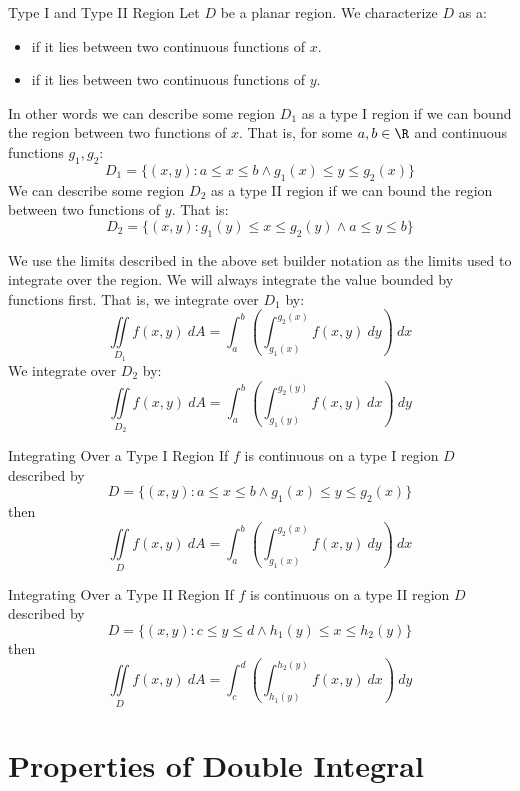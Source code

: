 \begin{dfnbox}{Type I and Type II Region}{}
    Let $D$ be a planar region. We characterize $D$ as a:
    \begin{itemize}
        \item {} if it lies between two continuous functions of $x$.
        \item {} if it lies between two continuous functions of $y$.
    \end{itemize}
\end{dfnbox}

In other words we can describe some region $D_1$ as a type I region if we can bound the region between two functions of $x$. That is, for some $a,b \in \R$ and continuous functions $g_1,g_2$:
\[ D_1 = \{ (x,y) : a \leq x \leq b \land g_1(x) \leq y \leq g_2(x) \} \]
We can describe some region $D_2$ as a type II region if we can bound the region between two functions of $y$. That is:
\[ D_2 = \{ (x,y) : g_1(y) \leq x \leq g_2(y) \land a \leq y \leq b \} \]

We use the limits described in the above set builder notation as the limits used to integrate over the region. We will always integrate the value bounded by functions first. That is, we integrate over $D_1$ by:
\[ \iint\limits_{D_1} f(x,y)\ dA = \int_a^b \left( \int_{g_1(x)}^{g_2(x)} f(x,y)\ dy \right)\ dx \]
We integrate over $D_2$ by:
\[ \iint\limits_{D_2} f(x,y)\ dA = \int_a^b \left( \int_{g_1(y)}^{g_2(y)} f(x,y)\ dx \right)\ dy \]


\begin{tecbox}{Integrating Over a Type I Region}
    If $f$ is continuous on a type I region $D$ described by
    \[ D = \{ (x,y) : a \leq x \leq b \land g_1(x) \leq y \leq g_2(x) \} \]
    then
    \[ \iint\limits_D f(x,y)\ dA = \int_{a}^{b} \left( \int_{g_1(x)}^{g_2(x)} f(x,y)\ dy \right)\ dx  \]
\end{tecbox}

\begin{tecbox}{Integrating Over a Type II Region}
    If $f$ is continuous on a type II region $D$ described by
    \[ D = \{ (x,y) : c \leq y \leq d \land h_1(y) \leq x \leq h_2(y) \} \]
    then
    \[ \iint\limits_D f(x,y)\ dA = \int_{c}^{d} \left( \int_{h_1(y)}^{h_2(y)} f(x,y)\ dx \right)\ dy \]
\end{tecbox}

\section{Properties of Double Integral}

